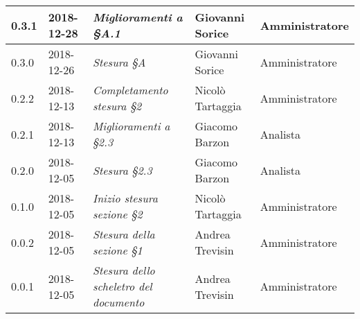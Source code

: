 \begin{longtable}{C{2cm}|C{2.5cm}|C{4.5cm}|C{2.5cm}|C{3cm}}
		0.3.1 & 2018-12-28 & \emph{Miglioramenti a §A.1} & Giovanni Sorice & Amministratore \\
		\hline
		
		0.3.0 & 2018-12-26 & \emph{Stesura §A} & Giovanni Sorice & Amministratore \\
		\hline
		
		0.2.2 & 2018-12-13 & \emph{Completamento stesura §2} & Nicolò Tartaggia & Amministratore \\
		\hline
		
		0.2.1 & 2018-12-13 & \emph{Miglioramenti a §2.3} & Giacomo Barzon & Analista \\
		\hline
		
		0.2.0 & 2018-12-05 & \emph{Stesura §2.3} & Giacomo Barzon & Analista \\
		\hline
		
		0.1.0 & 2018-12-05 & \emph{Inizio stesura sezione §2} & Nicolò Tartaggia & Amministratore \\
		\hline
		
		0.0.2 & 2018-12-05 & \emph{Stesura della sezione §1} & Andrea Trevisin & Amministratore \\
		\hline
		
		0.0.1 & 2018-12-05 & \emph{Stesura dello scheletro del documento} & Andrea Trevisin & Amministratore \\
		
	\end{longtable}


\clearpage